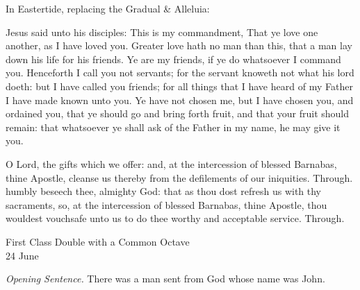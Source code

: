 
\begin{rubric}
{In Eastertide, replacing the Gradual \& Alleluia:}
\end{rubric}


 Jesus said unto his disciples: This is my commandment, That ye love one another, as I have loved you. Greater love hath no man than this, that a man lay down his life for his friends. Ye are my friends, if ye do whatsoever I command you. Henceforth I call you not servants; for the servant knoweth not what his lord doeth: but I have called you friends; for all things that I have heard of my Father I have made known unto you. Ye have not chosen me, but I have chosen you, and ordained you, that ye should go and bring forth fruit, and that your fruit should remain: that whatsoever ye shall ask of the Father in my name, he may give it you.

\secret
{} O Lord, the gifts which we offer: and, at the intercession of blessed Barnabas, thine Apostle, cleanse us thereby from the defilements of our iniquities. Through.
\postcommunion
{} humbly beseech thee, almighty God: that as thou dost refresh us with thy sacraments, so, at the intercession of blessed Barnabas, thine Apostle, thou wouldest vouchsafe unto us to do thee worthy and acceptable service. Through.


\label{StJohnBaptist}
\begin{inhead}
    {First Class Double with a Common Octave\\
24 June}
\end{inhead}
\par\noindent
\textit{Opening Sentence.} There was a man sent from God whose name was John.

